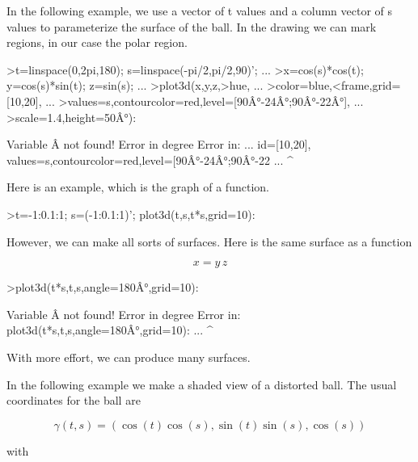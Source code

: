 \documentclass[a4paper,10pt]{article}
\begin{document}
\begin{eulernotebook}
\begin{eulercomment}
In the following example, we use a vector of t values and a column vector of s values to parameterize the surface of the
ball. In the drawing we can mark regions, in our case the polar region.
\end{eulercomment}
\begin{eulerprompt}
>t=linspace(0,2pi,180); s=linspace(-pi/2,pi/2,90)'; ...
>x=cos(s)*cos(t); y=cos(s)*sin(t); z=sin(s); ...
>plot3d(x,y,z,>hue, ...
>color=blue,<frame,grid=[10,20], ...
>values=s,contourcolor=red,level=[90Â°-24Â°;90Â°-22Â°], ...
>scale=1.4,height=50Â°):
\end{eulerprompt}
\begin{euleroutput}
  Variable Â not found!
  Error in degree
  Error in:
  ... id=[10,20], values=s,contourcolor=red,level=[90Â°-24Â°;90Â°-22 ...
                                                       ^
\end{euleroutput}
\begin{eulercomment}
Here is an example, which is the graph of a function.
\end{eulercomment}
\begin{eulerprompt}
>t=-1:0.1:1; s=(-1:0.1:1)'; plot3d(t,s,t*s,grid=10):
\end{eulerprompt}
\begin{eulercomment}
However, we can make all sorts of surfaces. Here is the same surface
as a function

\end{eulercomment}
\begin{eulerformula}
\[
x = y \, z
\]
\end{eulerformula}
\begin{eulerprompt}
>plot3d(t*s,t,s,angle=180Â°,grid=10):
\end{eulerprompt}
\begin{euleroutput}
  Variable Â not found!
  Error in degree
  Error in:
  plot3d(t*s,t,s,angle=180Â°,grid=10): ...
                            ^
\end{euleroutput}
\begin{eulercomment}
With more effort, we can produce many surfaces.

In the following example we make a shaded view of a distorted ball. The usual coordinates for the ball are

\end{eulercomment}
\begin{eulerformula}
\[
\gamma(t,s) = (\cos(t)\cos(s),\sin(t)\sin(s),\cos(s))
\]
\end{eulerformula}
\begin{eulercomment}
with


\end{eulercomment}
\end{eulernotebook}
\end{document}
